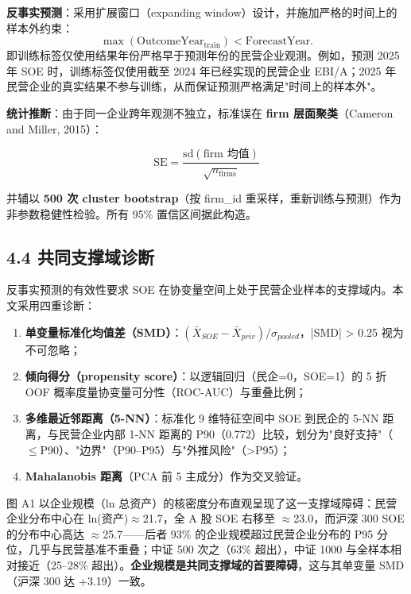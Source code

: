 \documentclass[11pt,a4paper]{ctexart}
\begin{document}
\textbf{反事实预测}：采用扩展窗口（expanding window）设计，并施加严格的时间上的样本外约束：
\[
\max\left(\text{OutcomeYear}_{\text{train}}\right) < \text{ForecastYear}.
\]
即训练标签仅使用结果年份严格早于预测年份的民营企业观测。例如，预测 2025 年 SOE 时，训练标签仅使用截至 2024 年已经实现的民营企业 EBI/A；2025 年民营企业的真实结果不参与训练，从而保证预测严格满足"时间上的样本外"。

\textbf{统计推断}：由于同一企业跨年观测不独立，标准误在 \textbf{firm 层面聚类}（Cameron and Miller, 2015）：

\[\text{SE} = \frac{\text{sd}(\text{firm 均值})}{\sqrt{n_{\text{firms}}}}\]

并辅以 \textbf{500 次 cluster bootstrap}（按 firm\_id 重采样，重新训练与预测）作为非参数稳健性检验。所有 95\% 置信区间据此构造。

\subsection{4.4 共同支撑域诊断}

反事实预测的有效性要求 SOE 在协变量空间上处于民营企业样本的支撑域内。本文采用四重诊断：

\begin{enumerate}

  \item \textbf{单变量标准化均值差（SMD）}：\((\bar{X}_{SOE} - \bar{X}_{priv}) / \sigma_{pooled}\)，|SMD| > 0.25 视为不可忽略；

  \item \textbf{倾向得分（propensity score）}：以逻辑回归（民企=0，SOE=1）的 5 折 OOF 概率度量协变量可分性（ROC-AUC）与重叠比例；

  \item \textbf{多维最近邻距离（5-NN）}：标准化 9 维特征空间中 SOE 到民企的 5-NN 距离，与民营企业内部 1-NN 距离的 P90（0.772）比较，划分为"良好支持"（$\le$P90）、"边界"（P90--P95）与"外推风险"（>P95）；

  \item \textbf{Mahalanobis 距离}（PCA 前 5 主成分）作为交叉验证。

\end{enumerate}

图 A1 以企业规模（ln 总资产）的核密度分布直观呈现了这一支撑域障碍：民营企业分布中心在 ln(资产)$\approx$21.7，全 A 股 SOE 右移至 $\approx$23.0，而沪深 300 SOE 的分布中心高达 $\approx$25.7------后者 93\% 的企业规模超过民营企业分布的 P95 分位，几乎与民营基准不重叠；中证 500 次之（63\% 超出），中证 1000 与全样本相对接近（25--28\% 超出）。\textbf{企业规模是共同支撑域的首要障碍}，这与其单变量 SMD（沪深 300 达 +3.19）一致。
\end{document}

